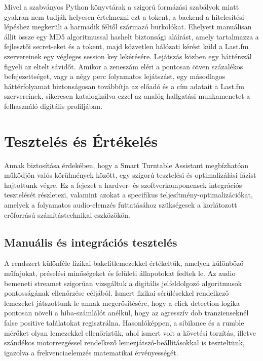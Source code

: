 \documentclass[12pt,a4paper,hungarian]{report}
\begin{document}
Mivel a szabványos Python könyvtárak a szigorú formázási szabályok miatt gyakran nem tudják helyesen értelmezni ezt a tokent, a backend a hitelesítési lépéshez megkerüli a harmadik féltől származó burkolókat. Ehelyett manuálisan állít össze egy MD5 algoritmussal hashelt biztonsági aláírást, amely tartalmazza a fejlesztői secret-eket és a tokent, majd közvetlen hálózati kérést küld a Last.fm szervereinek egy végleges session key lekérésére. Lejátszás közben egy háttérszál figyeli az eltelt sávidőt. Amikor a zeneszám eléri a pontosan ötven százalékos befejezettséget, vagy a négy perc folyamatos lejátszást, egy másodlagos háttérfolyamat biztonságosan továbbítja az előadó és a cím adatait a Last.fm szervereinek, sikeresen katalogizálva ezzel az analóg hallgatási munkamenetet a felhasználó digitális profiljában.

\chapter{Tesztelés és Értékelés}

Annak biztosítása érdekében, hogy a Smart Turntable Assistant megbízhatóan működjön valós körülmények között, egy szigorú tesztelési és optimalizálási fázist hajtottunk végre. Ez a fejezet a hardver- és szoftverkomponensek integrációs tesztelését részletezi, valamint azokat a specifikus teljesítmény-optimalizációkat, amelyek a folyamatos audio-elemzés futtatásához szükségesek a korlátozott erőforrású számítástechnikai eszközökön.

\section{Manuális és integrációs tesztelés}

A rendszert különféle fizikai bakelitlemezekkel értékeltük, amelyek különböző műfajokat, préselési minőségeket és felületi állapotokat fedtek le. Az audio bemeneti streamet szigorúan vizsgáltuk a digitális jelfeldolgozó algoritmusok pontosságának ellenőrzése céljából. Ismert fizikai sérülésekkel rendelkező lemezeket játszottunk le annak megerősítésére, hogy a click detection logika pontosan növeli a hiba-számlálót anélkül, hogy az agresszív dob tranzienseknél false positive találatokat regisztrálna. Hasonlóképpen, a sibilance és a rumble mérőket olyan lemezekkel ellenőriztük, ahol ismert volt a követési torzítás, illetve szándékos motorrezgéssel rendelkező lemezjátszó-beállításokkal is teszteltünk, igazolva a frekvenciaelemzés matematikai érvényességét.
\end{document}
